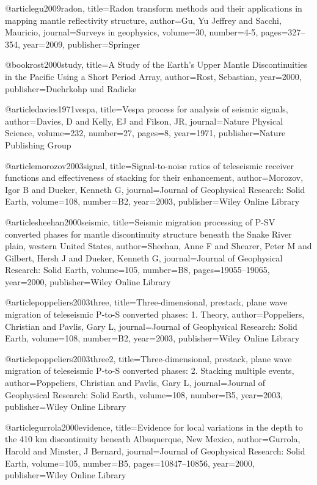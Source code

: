 @article{gu2009radon,
  title={Radon transform methods and their applications in mapping mantle reflectivity structure},
  author={Gu, Yu Jeffrey and Sacchi, Mauricio},
  journal={Surveys in geophysics},
  volume={30},
  number={4-5},
  pages={327--354},
  year={2009},
  publisher={Springer}
}


@book{rost2000study,
  title={A Study of the Earth's Upper Mantle Discontinuities in the Pacific Using a Short Period Array},
  author={Rost, Sebastian},
  year={2000},
  publisher={Duehrkohp und Radicke}
}

@article{davies1971vespa,
  title={Vespa process for analysis of seismic signals},
  author={Davies, D and Kelly, EJ and Filson, JR},
  journal={Nature Physical Science},
  volume={232},
  number={27},
  pages={8},
  year={1971},
  publisher={Nature Publishing Group}
}


@article{morozov2003signal,
  title={Signal-to-noise ratios of teleseismic receiver functions and effectiveness of stacking for their enhancement},
  author={Morozov, Igor B and Dueker, Kenneth G},
  journal={Journal of Geophysical Research: Solid Earth},
  volume={108},
  number={B2},
  year={2003},
  publisher={Wiley Online Library}
}

@article{sheehan2000seismic,
  title={Seismic migration processing of P-SV converted phases for mantle discontinuity structure beneath the Snake River plain, western United States},
  author={Sheehan, Anne F and Shearer, Peter M and Gilbert, Hersh J and Dueker, Kenneth G},
  journal={Journal of Geophysical Research: Solid Earth},
  volume={105},
  number={B8},
  pages={19055--19065},
  year={2000},
  publisher={Wiley Online Library}
}


@article{poppeliers2003three,
  title={Three-dimensional, prestack, plane wave migration of teleseismic P-to-S converted phases: 1. Theory},
  author={Poppeliers, Christian and Pavlis, Gary L},
  journal={Journal of Geophysical Research: Solid Earth},
  volume={108},
  number={B2},
  year={2003},
  publisher={Wiley Online Library}
}

@article{poppeliers2003three2,
  title={Three-dimensional, prestack, plane wave migration of teleseismic P-to-S converted phases: 2. Stacking multiple events},
  author={Poppeliers, Christian and Pavlis, Gary L},
  journal={Journal of Geophysical Research: Solid Earth},
  volume={108},
  number={B5},
  year={2003},
  publisher={Wiley Online Library}
}

@article{gurrola2000evidence,
  title={Evidence for local variations in the depth to the 410 km discontinuity beneath Albuquerque, New Mexico},
  author={Gurrola, Harold and Minster, J Bernard},
  journal={Journal of Geophysical Research: Solid Earth},
  volume={105},
  number={B5},
  pages={10847--10856},
  year={2000},
  publisher={Wiley Online Library}
}



